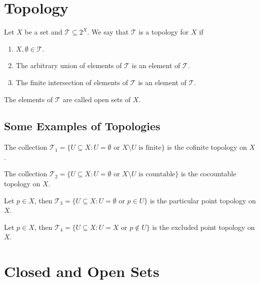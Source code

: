 \section{Topology}

\begin{definition}[Topology]
Let \(X\) be a set and \(\mathcal T \subseteq 2^X\). We say that \(\mathcal T\) is a
topology for \(X\) if
\begin{enumerate}[(T1)]
  \item \(X, \emptyset \in \mathcal T\).
  \item The arbitrary union of elements of \(\mathcal T\) is an element of
    \(\mathcal T\).
  \item The finite intersection of elements of \(\mathcal T\) is an element of
    \(\mathcal T\).
\end{enumerate}
The elements of \(\mathcal T\) are called open sets of \(X\).
\end{definition}

\subsection{Some Examples of Topologies}

\begin{example}
The collection \(\mathcal T_1 = \{U \subseteq X : U = \emptyset \text{ or } X \setminus U \text{ is
finite}\}\) is the cofinite topology on \(X\).
\end{example}

\begin{example}
The collection \(\mathcal T_2 = \{U \subseteq X : U = \emptyset \text{ or } X \setminus U \text{ is
countable}\}\) is the cocountable topology on \(X\).
\end{example}

\begin{example}
Let \(p \in X\), then \(\mathcal T_3 = \{U \subseteq X : U = \emptyset \text{ or } p \in U\}\) is
the particular point topology on \(X\).
\end{example}

\begin{example}
Let \(p \in X\), then \(\mathcal T_4 = \{U \subseteq X : U = X \text{ or } p \not\in U\}\)
is the excluded point topology on \(X\).
\end{example}

\section{Closed and Open Sets}

